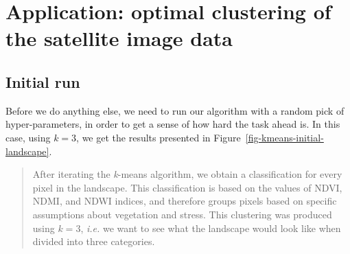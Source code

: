 \documentclass[
  letterpaper,
]{scrbook}
\begin{document}
\section{Application: optimal clustering of the satellite image
data}\label{application-optimal-clustering-of-the-satellite-image-data}

\subsection{Initial run}\label{sec-kmeans-initial}

Before we do anything else, we need to run our algorithm with a random
pick of hyper-parameters, in order to get a sense of how hard the task
ahead is. In this case, using \(k = 3\), we get the results presented in
Figure~\ref{fig-kmeans-initial-landscape}.

{
\makeatletter
\def\LT@makecaption#1#2#3{%
  \noalign{\smash{\hbox{\kern\textwidth\rlap{\kern\marginparsep
  \parbox[t]{\marginparwidth}{%
    \footnotesize{%
      \vspace{(1.1\baselineskip)}
    #1{#2: }\ignorespaces #3}}}}}}%
    }
\makeatother

\begin{figure}[bt]



\end{figure}%

}

\begin{quote}
After iterating the \emph{k}-means algorithm, we obtain a classification
for every pixel in the landscape. This classification is based on the
values of NDVI, NDMI, and NDWI indices, and therefore groups pixels
based on specific assumptions about vegetation and stress. This
clustering was produced using \(k=3\), \emph{i.e.} we want to see what
the landscape would look like when divided into three categories.
\end{quote}
\end{document}
